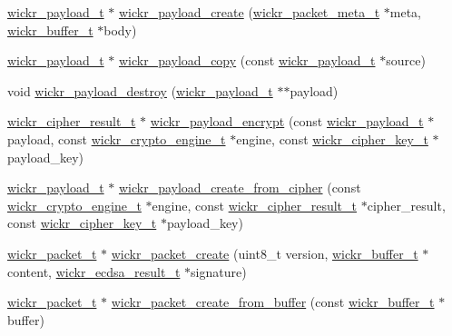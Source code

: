\begin{DoxyCompactItemize}
\item 
\hyperlink{structwickr__payload}{wickr\+\_\+payload\+\_\+t} $\ast$ \hyperlink{group__wickr__protocol_gad7d51d39a8477d87557536ff42399186}{wickr\+\_\+payload\+\_\+create} (\hyperlink{structwickr__packet__meta}{wickr\+\_\+packet\+\_\+meta\+\_\+t} $\ast$meta, \hyperlink{structwickr__buffer}{wickr\+\_\+buffer\+\_\+t} $\ast$body)
\item 
\hyperlink{structwickr__payload}{wickr\+\_\+payload\+\_\+t} $\ast$ \hyperlink{group__wickr__protocol_ga96e1b0eabf307d112985946cbe2f6969}{wickr\+\_\+payload\+\_\+copy} (const \hyperlink{structwickr__payload}{wickr\+\_\+payload\+\_\+t} $\ast$source)
\item 
void \hyperlink{group__wickr__protocol_ga821c48aa748408e47ba2149e1628a487}{wickr\+\_\+payload\+\_\+destroy} (\hyperlink{structwickr__payload}{wickr\+\_\+payload\+\_\+t} $\ast$$\ast$payload)
\item 
\hyperlink{structwickr__cipher__result}{wickr\+\_\+cipher\+\_\+result\+\_\+t} $\ast$ \hyperlink{group__wickr__protocol_ga7e4fd2ad4de22c2f7d6160400d2e15e7}{wickr\+\_\+payload\+\_\+encrypt} (const \hyperlink{structwickr__payload}{wickr\+\_\+payload\+\_\+t} $\ast$payload, const \hyperlink{structwickr__crypto__engine}{wickr\+\_\+crypto\+\_\+engine\+\_\+t} $\ast$engine, const \hyperlink{structwickr__cipher__key}{wickr\+\_\+cipher\+\_\+key\+\_\+t} $\ast$payload\+\_\+key)
\item 
\hyperlink{structwickr__payload}{wickr\+\_\+payload\+\_\+t} $\ast$ \hyperlink{group__wickr__protocol_gaeeebf95ba580b92254a91009245028ee}{wickr\+\_\+payload\+\_\+create\+\_\+from\+\_\+cipher} (const \hyperlink{structwickr__crypto__engine}{wickr\+\_\+crypto\+\_\+engine\+\_\+t} $\ast$engine, const \hyperlink{structwickr__cipher__result}{wickr\+\_\+cipher\+\_\+result\+\_\+t} $\ast$cipher\+\_\+result, const \hyperlink{structwickr__cipher__key}{wickr\+\_\+cipher\+\_\+key\+\_\+t} $\ast$payload\+\_\+key)
\item 
\hyperlink{structwickr__packet}{wickr\+\_\+packet\+\_\+t} $\ast$ \hyperlink{group__wickr__protocol_gac952913ddaf848d2def181cd55b30883}{wickr\+\_\+packet\+\_\+create} (uint8\+\_\+t version, \hyperlink{structwickr__buffer}{wickr\+\_\+buffer\+\_\+t} $\ast$content, \hyperlink{structwickr__ecdsa__result}{wickr\+\_\+ecdsa\+\_\+result\+\_\+t} $\ast$signature)
\item 
\hyperlink{structwickr__packet}{wickr\+\_\+packet\+\_\+t} $\ast$ \hyperlink{group__wickr__protocol_ga3427a40815c9f65a78516405d1b88072}{wickr\+\_\+packet\+\_\+create\+\_\+from\+\_\+buffer} (const \hyperlink{structwickr__buffer}{wickr\+\_\+buffer\+\_\+t} $\ast$buffer)
$$
\end{DoxyCompactItemize}
